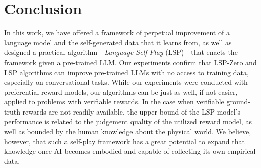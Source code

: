 \documentclass[]{fairmeta}
\begin{document}
\section{Conclusion}
In this work, we have offered a framework of perpetual improvement of a language model and the self-generated data that it learns from, as well as designed a practical algorithm---\emph{Language Self-Play} (LSP)---that enacts the framework given a pre-trained LLM. 
Our experiments confirm that LSP-Zero and LSP algorithms can improve pre-trained LLMs with no access to training data, especially on conversational tasks. 
While our experiments were conducted with preferential reward models, our algorithms can be just as well, if not easier, applied to problems with verifiable rewards.
In the case when verifiable ground-truth rewards are not readily available, the upper bound of the LSP model's performance is related to the judgement quality of the utilized reward model, as well as bounded by the human knowledge about the physical world. 
We believe, however, that such a self-play framework has a great potential to expand that knowledge once AI becomes embodied and capable of collecting its own empirical data.








\clearpage
\beginappendix
\end{document}
